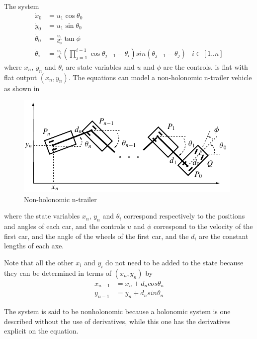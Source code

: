 \documentclass[12pt]{article}
\begin{document}
\begin{example} \label{expNonHoloVehicle}
  The system
  \begin{equation}\begin{aligned}
    \dot{x}_0 &= u_1 \cos{\theta_0} \\
    \dot{y}_0 &= u_1 \sin{\theta_0} \\
    \dot{\theta}_0 &= \frac{u_1}{d_0} \tan{\phi} \\
    \dot{\theta}_i &= \frac{u_1}{d_i} \left( \prod_{j=1}^{i-1} \cos{\theta_{j-1} - \theta_i} \right) sin ( \theta_{j-1} - \theta_j ) & i \in [1 ..  n]
  \end{aligned}\end{equation}
  where $x_n$, $y_n$ and $\theta_i$ are state variables and $u$ and $\phi$ are the controls.
  is flat with flat output $(x_n, y_n)$.
  The equations can model a non-holonomic n-trailer vehicle as shown in 
  
  \begin{figure}[h]
    \centering
    \includegraphics{non_holonomic_ntrailler}
    \caption{Non-holonomic n-trailer}
    \label{figNonHoloVehicle}
  \end{figure}
  
  where the state variables $x_n$, $y_n$ and $\theta_i$ correspond respectively to the
  positions and angles of each car, and the controls $u$ and $\phi$ correspond to the
  velocity of the first car, and the angle of the wheels of the first car,
  and the $d_i$ are the constant lengths of each axe.
  
  Note that all the other $x_i$ and $y_i$ do not need to be added to the state
  because they can be determined in terms of $(x_n,y_n)$ by
  \begin{equation}\begin{aligned}
    x_{n-1} &= x_n + d_n cos \theta_n \\
    y_{n-1} &= y_n + d_n sin \theta_n
  \end{aligned}\end{equation}  

  The system is said to be nonholonomic because a holonomic system is one described
  without the use of derivatives, while this one has the derivatives explicit on the
  equation.
\end{example}
\end{document}
